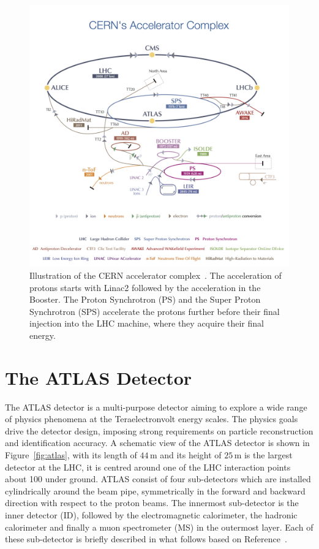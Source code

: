 \begin{figure}[tp]
     \begin{center}

            \includegraphics[width=\textwidth]{figure/LHC2.jpg}

    \end{center}
    \caption{Illustration of the CERN accelerator complex~\cite{lhcImage}. The acceleration of protons starts with Linac2 followed by the
	acceleration in the Booster. The Proton Synchrotron (PS) and the Super Proton Synchrotron (SPS) accelerate the protons further  before
	their final injection into the LHC  machine, where they acquire their final energy.}


   \label{fig:LHC}
\end{figure}


\section{The ATLAS Detector}\label{sec:atlas}
The ATLAS detector is a multi-purpose detector aiming to explore a wide range of physics 
phenomena at the Teraelectronvolt energy scales.
The physics goals drive the detector design, imposing strong requirements on particle reconstruction and 
 identification accuracy.
A schematic view of the ATLAS detector is shown in Figure~\ref{fig:atlas}, 
with its length of $44\,$m and its height of $25\,$m  is the largest detector at the LHC, it is centred around one of the LHC interaction points about
100 under ground. ATLAS consist of four sub-detectors which are installed  cylindrically around the
beam pipe, symmetrically in the forward and backward direction with respect to the proton beams.
The innermost sub-detector is the inner detector (ID), followed by the electromagnetic calorimeter, the hadronic calorimeter and finally
a muon spectrometer (MS) in the outermost layer. Each of these sub-detector is briefly described in what follows based on  Reference~\cite{ATLASDetector}.


